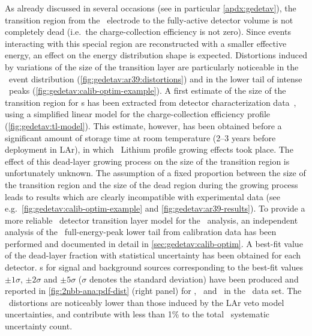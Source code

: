 \begin{description}[wide]
  \item[Transition layer model] As already discussed in several occasions (see in
    particular \cref{apdx:gedetav}), the transition region from the \nplus\ electrode to
    the fully-active detector volume is not completely dead (i.e.~the charge-collection
    efficiency is not zero). Since events interacting with this special region are
    reconstructed with a smaller effective energy, an effect on the energy distribution
    shape is expected. Distortions induced by variations of the size of the transition
    layer are particularly noticeable in the \Arl\ event distribution
    (\cref{fig:gedetav:ar39:distortions}) and in the lower tail of intense \g\ peaks
    (\cref{fig:gedetav:calib-optim-example}). A first estimate of the size of the
    transition region for \bege{}s has been extracted from detector characterization
    data~\cite{Lehnert2016}, using a simplified linear model for the charge-collection
    efficiency profile (\cref{fig:gedetav:tl-model}). This estimate, however, has been
    obtained before a significant amount of storage time at room temperature (2--3 years
    before deployment in LAr), in which \nplus\ Lithium profile growing effects took
    place. The effect of this dead-layer growing process on the size of the transition
    region is unfortunately unknown. The assumption of a fixed proportion between the size
    of the transition region and the size of the dead region during the growing process
    leads to results which are clearly incompatible with experimental data (see
    e.g.~\cref{fig:gedetav:calib-optim-example} and \cref{fig:gedetav:ar39-results}).
    \newpar
    To provide a more reliable \bege\ detector transition layer model for the \nnbb\
    analysis, an independent analysis of the \Th\ full-energy-peak lower tail from
    calibration data has been performed and documented in detail in
    \cref{sec:gedetav:calib-optim}. A best-fit value of the dead-layer fraction with
    statistical uncertainty has been obtained for each detector. \pdf{}s for signal and
    background sources corresponding to the best-fit values $\pm1\sigma$, $\pm2\sigma$ and
    $\pm5\sigma$ ($\sigma$ denotes the standard deviation) have been produced and
    reported in \cref{fig:2nbb-ana:pdf-dist} (right panel) for \kvn, \kvz\ and \nnbb\ in
    the \enrBEGeII\ data set. The \pdf\ distortions are noticeably lower than those induced
    by the LAr veto model uncertainties, and contribute with less than 1\% to the total
    \thalftwo\ systematic uncertainty count.


\end{description}

